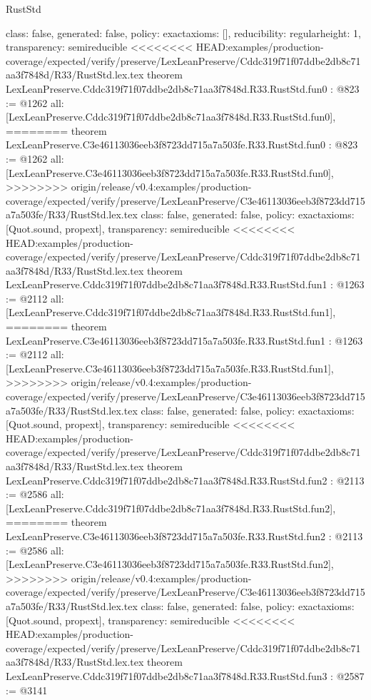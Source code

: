 \begin{lexlean}{RustStd}
\begin{coremodule}
{\begin{coremodule}
{{{  class: false,
  generated: false,
  policy: exact{axioms: []},
  reducibility: regular{height: 1},
  transparency: semireducible
}
<<<<<<<< HEAD:examples/production-coverage/expected/verify/preserve/LexLeanPreserve/Cddc319f71f07ddbe2db8c71aa3f7848d/R33/RustStd.lex.tex
theorem LexLeanPreserve.Cddc319f71f07ddbe2db8c71aa3f7848d.R33.RustStd.fun0 : @823 := @1262 {
  all: [LexLeanPreserve.Cddc319f71f07ddbe2db8c71aa3f7848d.R33.RustStd.fun0],
========
theorem LexLeanPreserve.C3e46113036eeb3f8723dd715a7a503fe.R33.RustStd.fun0 : @823 := @1262 {
  all: [LexLeanPreserve.C3e46113036eeb3f8723dd715a7a503fe.R33.RustStd.fun0],
>>>>>>>> origin/release/v0.4:examples/production-coverage/expected/verify/preserve/LexLeanPreserve/C3e46113036eeb3f8723dd715a7a503fe/R33/RustStd.lex.tex
  class: false,
  generated: false,
  policy: exact{axioms: [Quot.sound, propext]},
  transparency: semireducible
}
<<<<<<<< HEAD:examples/production-coverage/expected/verify/preserve/LexLeanPreserve/Cddc319f71f07ddbe2db8c71aa3f7848d/R33/RustStd.lex.tex
theorem LexLeanPreserve.Cddc319f71f07ddbe2db8c71aa3f7848d.R33.RustStd.fun1 : @1263 := @2112 {
  all: [LexLeanPreserve.Cddc319f71f07ddbe2db8c71aa3f7848d.R33.RustStd.fun1],
========
theorem LexLeanPreserve.C3e46113036eeb3f8723dd715a7a503fe.R33.RustStd.fun1 : @1263 := @2112 {
  all: [LexLeanPreserve.C3e46113036eeb3f8723dd715a7a503fe.R33.RustStd.fun1],
>>>>>>>> origin/release/v0.4:examples/production-coverage/expected/verify/preserve/LexLeanPreserve/C3e46113036eeb3f8723dd715a7a503fe/R33/RustStd.lex.tex
  class: false,
  generated: false,
  policy: exact{axioms: [Quot.sound, propext]},
  transparency: semireducible
}
<<<<<<<< HEAD:examples/production-coverage/expected/verify/preserve/LexLeanPreserve/Cddc319f71f07ddbe2db8c71aa3f7848d/R33/RustStd.lex.tex
theorem LexLeanPreserve.Cddc319f71f07ddbe2db8c71aa3f7848d.R33.RustStd.fun2 : @2113 := @2586 {
  all: [LexLeanPreserve.Cddc319f71f07ddbe2db8c71aa3f7848d.R33.RustStd.fun2],
========
theorem LexLeanPreserve.C3e46113036eeb3f8723dd715a7a503fe.R33.RustStd.fun2 : @2113 := @2586 {
  all: [LexLeanPreserve.C3e46113036eeb3f8723dd715a7a503fe.R33.RustStd.fun2],
>>>>>>>> origin/release/v0.4:examples/production-coverage/expected/verify/preserve/LexLeanPreserve/C3e46113036eeb3f8723dd715a7a503fe/R33/RustStd.lex.tex
  class: false,
  generated: false,
  policy: exact{axioms: [Quot.sound, propext]},
  transparency: semireducible
}
<<<<<<<< HEAD:examples/production-coverage/expected/verify/preserve/LexLeanPreserve/Cddc319f71f07ddbe2db8c71aa3f7848d/R33/RustStd.lex.tex
theorem LexLeanPreserve.Cddc319f71f07ddbe2db8c71aa3f7848d.R33.RustStd.fun3 : @2587 := @3141 {
}}}}}}
\end{coremodule}}
\end{coremodule}
\end{lexlean}
